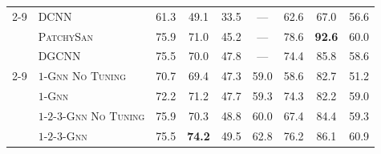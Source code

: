 \documentclass[letterpaper]{article}
\theoremstyle{definition}
\begin{document}
\begin{table}[t]
\begin{tabular}{@{}clccccccc@{}}
		\\
		\cmidrule{2-9}
		\multirow{7}{*}{\rotatebox{90}{GNN}}
		& \textsc{DCNN}                      & 61.3           & 49.1                & 33.5                  & ---                 & 62.6              & 67.0               & 56.6                \\
		& \textsc{PatchySan}                 & 75.9           & 71.0                & 45.2                  & ---                 & 78.6              & \textbf{92.6}      & 60.0                \\
		& \textsc{DGCNN}                     & 75.5           & 70.0                & 47.8                  & ---                 & 74.4              & 85.8               & 58.6                \\     
		\cmidrule{2-9}   
		
		& \textsc{$1$-Gnn No Tuning}         & 70.7           & 69.4                & 47.3                  & 59.0                & 58.6              & 82.7               & 51.2                \\
		& \textsc{$1$-Gnn}                   & 72.2           & 71.2                & 47.7                  & 59.3                & 74.3              & 82.2               & 59.0                \\
		& \textsc{$1$-$2$-$3$-Gnn No Tuning} & 75.9           & 70.3                & 48.8                  & 60.0                & 67.4              & 84.4               & 59.3                \\
		& \textsc{$1$-$2$-$3$-Gnn}           & 75.5           & \textbf{74.2}       & 49.5                  & 62.8                & 76.2              & 86.1               & 60.9                \\
		\bottomrule
	\end{tabular}
\end{table}
\end{document}
